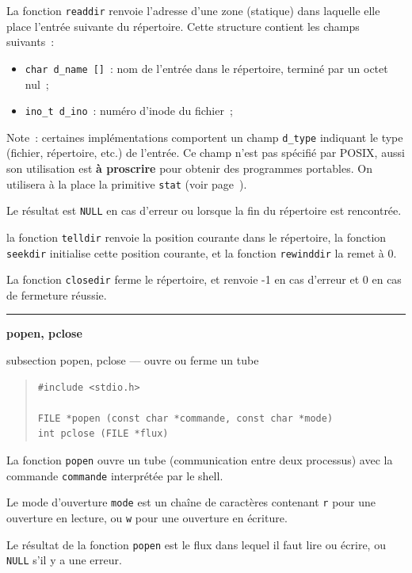 \documentclass [twoside] {report}
\newcommand {\primitive} [1]
    {
	\phantomsection
	{\large \textbf {#1}}
	\addcontentsline {toc} {subsection} {#1}
    }
\newcommand {\separation}
    {
	\vspace {5mm}
	\nopagebreak
	\hrule
    }
\begin{document}
La fonction \texttt {readdir} renvoie l'adresse d'une zone (statique) dans
laquelle elle place l'entrée suivante du répertoire. Cette structure
contient les champs suivants~:

\begin {itemize}
    \item \texttt {char d\_name []}~: nom de l'entrée dans le
	répertoire, terminé par un octet nul~;
    \item \texttt {ino\_t d\_ino}~: numéro d'inode du fichier~;
\end {itemize}

Note~: certaines implémentations comportent un champ \texttt {d\_type}
indiquant le type (fichier, répertoire, etc.) de l'entrée. Ce champ
n'est pas spécifié par POSIX, aussi son utilisation est \textbf
{à proscrire} pour obtenir des programmes portables. On utilisera à
la place la primitive \texttt {stat} (voir page~\pageref {stat}).

Le résultat est \texttt {NULL} en cas d'erreur ou lorsque la fin du
répertoire est rencontrée.

la fonction \texttt {telldir} renvoie la position courante dans le
répertoire, la fonction \texttt {seekdir} initialise cette position
courante, et la fonction \texttt {rewinddir} la remet à 0.

La fonction \texttt {closedir} ferme le répertoire, et renvoie -1 en cas
d'erreur et 0 en cas de fermeture réussie.


\separation
\primitive {popen, pclose} --- ouvre ou ferme un tube

\begin {quote}
\begin {verbatim}
#include <stdio.h>

FILE *popen (const char *commande, const char *mode)
int pclose (FILE *flux)
\end{verbatim}
\end {quote}

La fonction \texttt {popen} ouvre un tube (communication entre
deux processus) avec la commande \texttt {commande} interprétée par
le shell.

Le mode d'ouverture \texttt {mode} est un chaîne de caractères
contenant \texttt {r} pour une ouverture en lecture, ou \texttt {w} pour
une ouverture en écriture.

Le résultat de la fonction \texttt {popen} est le flux dans lequel
il faut lire ou écrire, ou \texttt {NULL} s'il y a une erreur.
\end{document}
